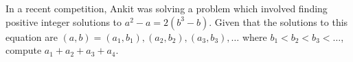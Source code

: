 In a recent competition, Ankit was solving a problem which involved finding positive integer solutions to $a^2-a=2\left(b^3-b\right)$. Given that the solutions to this equation are $\left(a,b\right)=\left(a_1,b_1\right),\left(a_2,b_2\right),\left(a_3,b_3\right),\ldots$ where $b_1<b_2<b_3<\ldots$, compute $a_1+a_2+a_3+a_4$.